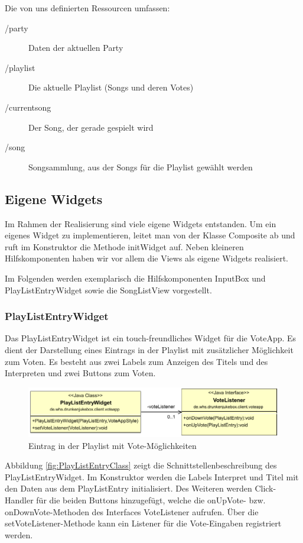 Die von uns definierten Ressourcen umfassen:
\begin{description}
	\item[/party] Daten der aktuellen Party
	\item[/playlist] Die aktuelle Playlist (Songs und deren Votes)
	\item[/currentsong] Der Song, der gerade gespielt wird
	\item[/song] Songsammlung, aus der Songs für die Playlist gewählt werden
\end{description}

\subsection{Eigene Widgets}
Im Rahmen der Realisierung sind viele eigene Widgets entstanden. Um ein eigenes Widget zu implementieren, leitet man von der Klasse Composite ab und ruft im Konstruktor die Methode initWidget auf. Neben kleineren Hilfskomponenten haben wir vor allem die Views als eigene Widgets realisiert.

Im Folgenden werden exemplarisch die Hilfskomponenten InputBox und PlayListEntryWidget sowie die SongListView vorgestellt.

\subsubsection{PlayListEntryWidget}
Das PlayListEntryWidget ist ein touch-freundliches Widget für die VoteApp. Es dient der Darstellung eines Eintrags in der Playlist mit zusätzlicher Möglichkeit zum Voten. Es besteht aus zwei Labels zum Anzeigen des Titels und des Interpreten und zwei Buttons zum Voten. 

\begin{figure}[tbh]
	\centering
	\includegraphics[width=0.7\linewidth]{Bilder/PlayListEntry}
	\caption{Eintrag in der Playlist mit Vote-Möglichkeiten}
	\label{fig:PlayListEntry}
\end{figure}

Abbildung \ref{fig:PlayListEntryClass} zeigt die Schnittstellenbeschreibung des PlayListEntryWidget. Im Konstruktor werden die Labels Interpret und Titel mit den Daten aus dem PlayListEntry initialisiert. Des Weiteren werden Click-Handler für die beiden Buttons hinzugefügt, welche die onUpVote- bzw. onDownVote-Methoden des Interfaces VoteListener aufrufen. Über die setVoteListener-Methode kann ein Listener für die Vote-Eingaben registriert werden.

